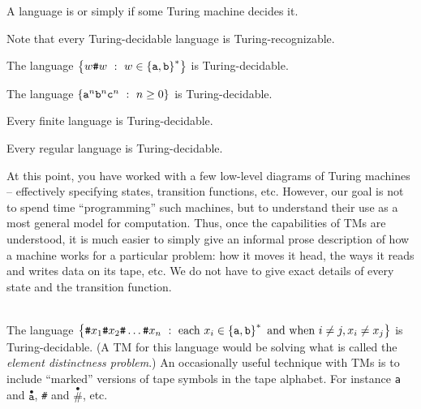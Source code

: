 \documentclass[twoside,letterpaper,openany]{book}
\begin{document}
\begin{defn}
A language is  or simply  if some Turing machine decides it.

Note that every Turing-decidable language is Turing-recognizable.
\end{defn}

\begin{stmt2}
The language $\left\lbrace w\texttt{\#}w\ :\ w \in \left\lbrace \texttt{a}, \texttt{b} \right\rbrace^{*} \right\rbrace$ is Turing-decidable.
\end{stmt2}

\begin{stmt2}
The language $\left\lbrace \texttt{a}^n \texttt{b}^n \texttt{c}^n\ :\  n \geq 0  \right\rbrace$ is Turing-decidable.
\end{stmt2}

\begin{stmt2}
Every finite language is Turing-decidable.
\end{stmt2}

\begin{lemma}[Optional] 
Every regular language is Turing-decidable.
\end{lemma}



\begin{discussion}
At this point, you have worked with a few low-level diagrams of Turing machines -- effectively specifying states, transition functions, etc. However, our goal is not to spend time ``programming'' such machines, but to understand their use as a most general model for computation. Thus, once the capabilities of TMs are understood, it is much easier to simply give an informal prose description of how a machine works for a particular problem: how it moves it head, the ways it reads and writes data on its tape, etc. We do not have to give exact details of every state and the transition function.
\end{discussion}

\begin{stmt3}~\\
The language $\left\lbrace \texttt{\#}x_1\texttt{\#}x_2\texttt{\#}\ldots\texttt{\#}x_n\ :\ \textrm{each}~x_i \in \left\lbrace \texttt{a}, \texttt{b} \right\rbrace^{*}
	~\textrm{and when}~ i \neq j, x_i \neq x_j \right\rbrace$ is Turing-decidable. (A TM for this language would be solving what is called the \emph{element distinctness problem}.)
\hint An occasionally useful technique with TMs is to include ``marked'' versions of tape symbols in the tape alphabet. For instance \texttt{a} and $\overset{\bullet}{\texttt{a}}$, \texttt{\#} and $\overset{\bullet}{\texttt{\#}}$, etc.
\end{stmt3}
\end{document}
